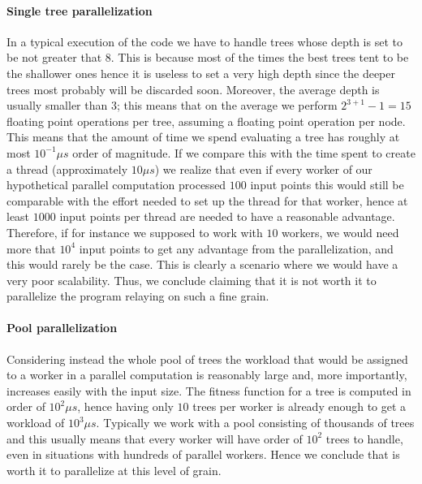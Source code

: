 \documentclass[10pt]{article}
\numberwithin{equation}{section}
\begin{document}
\paragraph{Single tree parallelization}
In a typical execution of the code we have to handle trees whose depth is set to be not greater that $8$. This is because most of the times the best trees tent to be the shallower ones hence it is useless to set a very high depth since the deeper trees most probably will be discarded soon. Moreover, the average depth is usually smaller than $3$; this means that on the average we perform $2^{3+1}-1=15$ floating point operations per tree, assuming a floating point operation per node. This means that the amount of time we spend evaluating a tree has roughly at most $10^{-1}\mu$$s$ order of magnitude. If we compare this with the time spent to create a thread (approximately $10\mu$$s$) we realize that even if every worker of our hypothetical parallel computation processed $100$ input points this would still be comparable with the effort needed to set up the thread for that worker, hence at least $1000$ input points per thread are needed to have a reasonable advantage. Therefore, if for instance we supposed to work with $10$ workers, we would need more that $10^{4}$ input points to get any advantage from the parallelization, and this would rarely be the case. This is clearly a scenario where we would have a very poor scalability. Thus, we conclude claiming that it is not worth it to parallelize the program relaying on such a fine grain.
\paragraph{Pool parallelization}
Considering instead the whole pool of trees the workload that would be assigned to a worker in a parallel computation is reasonably large and, more importantly, increases easily with the input size. The fitness function for a tree is computed in order of $10^{2}\mu$$s$, hence having only $10$ trees per worker is already enough to get a workload of $10^{3}\mu$$s$. Typically we work with a pool consisting of thousands of trees and this usually means that every worker will have order of $10^{2}$ trees to handle, even in situations with hundreds of parallel workers. Hence we conclude that is worth it to parallelize at this level of grain.
\end{document}
